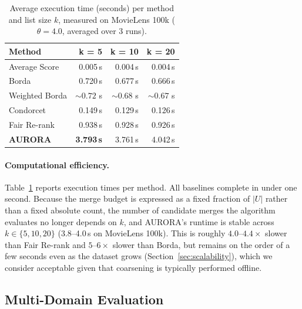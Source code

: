 \documentclass[runningheads]{llncs}
\begin{document}
\begin{table}[h!]
\caption{Average execution time (seconds) per method and list size $k$,
         measured on MovieLens 100k ($\theta = 4.0$, averaged over 3 runs).}
\label{tab:runtime}
\centering
\begin{tabular}{lrrr}
\hline
\textbf{Method} & \textbf{k = 5} & \textbf{k = 10} & \textbf{k = 20} \\
\hline
Average Score  &   0.005\,s &   0.004\,s &   0.004\,s \\
Borda          &   0.720\,s &   0.677\,s &   0.666\,s \\
Weighted Borda & ${\sim}0.72$ s & ${\sim}0.68$ s & ${\sim}0.67$ s \\
Condorcet      &   0.149\,s &   0.129\,s &   0.126\,s \\
Fair Re-rank   &   0.938\,s &   0.928\,s &   0.926\,s \\
\textbf{AURORA}  & \textbf{3.793\,s} & 3.761\,s &   4.042\,s \\
\hline
\end{tabular}
\end{table}

\paragraph{Computational efficiency.}
Table~\ref{tab:runtime} reports execution times per method. All baselines complete in
under one second. Because the merge budget is expressed as a fixed
fraction of $|U|$ rather than a fixed absolute count, the number of
candidate merges the algorithm evaluates no longer depends on $k$, and
AURORA's runtime is stable across $k \in \{5, 10, 20\}$ (3.8--4.0\,s on
MovieLens 100k). This is roughly $4.0$--$4.4\times$ slower than Fair Re-rank
and $5$--$6\times$ slower than Borda, but remains on the order of a
few seconds even as the dataset grows (Section~\ref{sec:scalability}), which we consider
acceptable given that coarsening is typically performed offline.

\subsection{Multi-Domain Evaluation}
\end{document}
